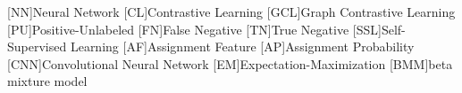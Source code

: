 \begin{acronym}

    [NN]{Neural Network}
    [CL]{Contrastive Learning}
    [GCL]{Graph Contrastive Learning}
    [PU]{Positive-Unlabeled}
    [FN]{False Negative}
    [TN]{True Negative}
    [SSL]{Self-Supervised Learning}
    [AF]{Assignment Feature}
    [AP]{Assignment Probability}
    [CNN]{Convolutional Neural Network}
    [EM]{Expectation-Maximization}
    [BMM]{beta mixture model}

\end{acronym}